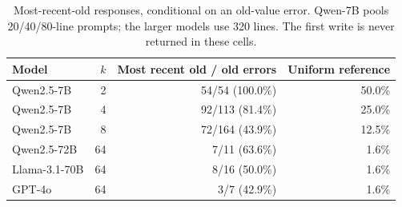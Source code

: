 \begin{table}[htbp]
\centering\small
\caption{Most-recent-old responses, conditional on an old-value error.
Qwen-7B pools 20/40/80-line prompts; the larger models use 320 lines.
The first write is never returned in these cells.}
\label{tab:which-old}
\begin{tabular}{@{}lrrr@{}}\toprule
Model & $k$ & Most recent old / old errors & Uniform reference \\
\midrule
Qwen2.5-7B & 2 & 54/54 (100.0\%) & 50.0\% \\
Qwen2.5-7B & 4 & 92/113 (81.4\%) & 25.0\% \\
Qwen2.5-7B & 8 & 72/164 (43.9\%) & 12.5\% \\
Qwen2.5-72B & 64 & 7/11 (63.6\%) & 1.6\% \\
Llama-3.1-70B & 64 & 8/16 (50.0\%) & 1.6\% \\
GPT-4o & 64 & 3/7 (42.9\%) & 1.6\% \\
\bottomrule\end{tabular}
\end{table}
